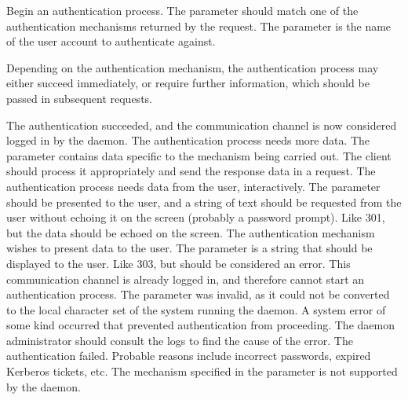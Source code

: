 
\begin{reqdesc}
  Begin an authentication process. The  parameter should
  match one of the authentication mechanisms returned by the
   request. The  parameter is the name
  of the user account to authenticate against.

  Depending on the authentication mechanism, the authentication
  process may either succeed immediately, or require further
  information, which should be passed in subsequent 
  requests.
\end{reqdesc}

\noperm

\begin{responses}
  The authentication succeeded, and the communication channel is now
  considered logged in by the daemon.
  The authentication process needs more data. The 
  parameter contains data specific to the mechanism being carried
  out. The client should process it appropriately and send the
  response data in a  request.
  The authentication process needs data from the user,
  interactively. The  parameter should be presented to
  the user, and a string of text should be requested from the user
  without echoing it on the screen (probably a password prompt).
  Like 301, but the data should be echoed on the screen.
  The authentication mechanism wishes to present data to the user. The
   parameter is a string that should be displayed to the
  user.
  Like 303, but  should be considered an error.
  This communication channel is already logged in, and therefore
  cannot start an authentication process.
  The  parameter was invalid, as it could not be
  converted to the local character set of the system running the
  daemon.
  A system error of some kind occurred that prevented authentication
  from proceeding. The daemon administrator should consult the logs to
  find the cause of the error.
  The authentication failed. Probable reasons include incorrect
  passwords, expired Kerberos tickets, etc.
  The mechanism specified in the  parameter is not
  supported by the daemon.
\end{responses}
